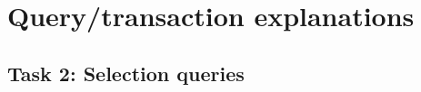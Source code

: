 \documentclass[a4paper, 12pt]{article}
\begin{document}
\newpage
\section{Query/transaction explanations} \label{sec:3}





% 
\subsection{Task 2: Selection queries}
\end{document}
